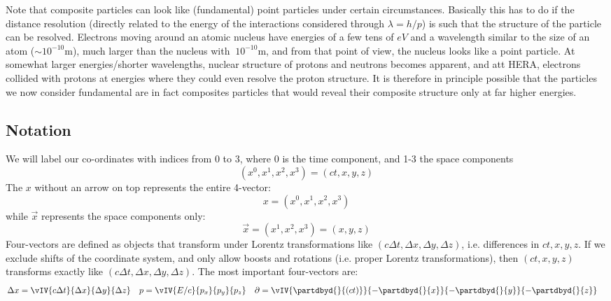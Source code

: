 Note that composite particles can look like (fundamental) point particles under certain circumstances. Basically this has to do if the distance resolution (directly related to the energy of the interactions considered through $\lambda = h/p$) is such that the structure of the particle can be resolved. Electrons moving around an atomic nucleus have energies of a few tens of $eV$ and a wavelength similar to the size of an atom ($\sim 10^{-10}$m), much larger than the nucleus with $~10^{-10}$m, and from that point of view, the nucleus looks like a point particle. At somewhat larger energies/shorter wavelengths, nuclear structure of protons and neutrons becomes apparent, and att HERA, electrons collided with protons at energies where they could even resolve the proton structure. It is therefore in principle possible that the particles we now consider fundamental are in fact composites particles that would reveal their composite structure only at far higher energies.


\subsection{Notation}
 We will label our co-ordinates with indices from 0 to 3, where 0 is the
 time component, and 1-3 the space components 
\[ (x^0, x^1, x^2, x^3) = (ct, x, y, z)\]
%  
  The $x$ without an arrow on top represents the entire 4-vector:
\[
 x = (x^0, x^1, x^2, x^3)
\]
  while $\vec{x}$ represents the space components only:
\[
\vec{x} = (x^1, x^2, x^3) = (x, y, z)
\]
Four-vectors are defined as objects that transform under Lorentz transformations like  $(c\mathit{\Delta t}, \mathit{\Delta x}, \mathit{\Delta y}, \mathit{\Delta z})$, i.e. differences in $ct, x, y, z$. If we exclude shifts of the coordinate system, and only allow boosts and rotations (i.e. proper Lorentz transformations), then $(ct, x, y, z)$ transforms exactly like $(c\mathit{\Delta t}, \mathit{\Delta x}, \mathit{\Delta y}, \mathit{\Delta z})$. The most important four-vectors are:
\begin{align}
  \Delta x &= \vIV{c\Delta t}{\Delta x}{\Delta y}{\Delta z}
& p &= \vIV{E/c}{p_x}{p_y}{p_z}
& \partial &= \vIV{\partdbyd{}{(ct)}}{-\partdbyd{}{x}}{-\partdbyd{}{y}}{-\partdbyd{}{z}}
\end{align}



